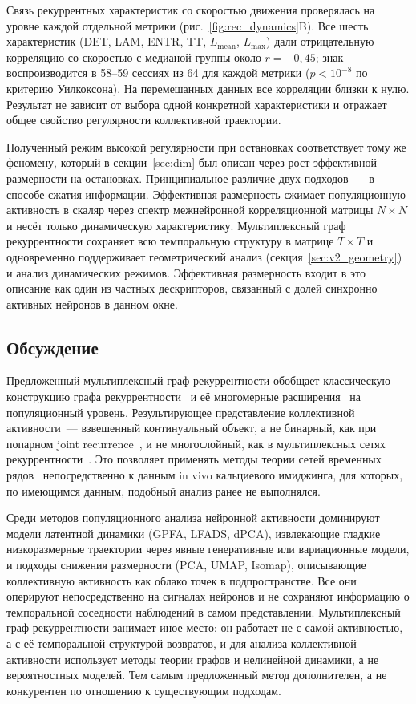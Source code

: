Связь рекуррентных характеристик со скоростью движения проверялась на уровне каждой отдельной метрики (рис.~\ref{fig:rec_dynamics}B). Все шесть характеристик (DET, LAM, ENTR, TT, $L_{\text{mean}}$, $L_{\text{max}}$) дали отрицательную корреляцию со скоростью с медианой группы около $r = -0{,}45$; знак воспроизводится в 58--59 сессиях из 64 для каждой метрики ($p < 10^{-8}$ по критерию Уилкоксона). На перемешанных данных все корреляции близки к нулю. Результат не зависит от выбора одной конкретной характеристики и отражает общее свойство регулярности коллективной траектории.

Полученный режим высокой регулярности при остановках соответствует тому же феномену, который в секции~\ref{sec:dim} был описан через рост эффективной размерности на остановках. Принципиальное различие двух подходов~--- в способе сжатия информации. Эффективная размерность сжимает популяционную активность в скаляр через спектр межнейронной корреляционной матрицы $N \times N$ и несёт только динамическую характеристику. Мультиплексный граф рекуррентности сохраняет всю темпоральную структуру в матрице $T \times T$ и одновременно поддерживает геометрический анализ (секция~\ref{sec:v2_geometry}) и анализ динамических режимов. Эффективная размерность входит в это описание как один из частных дескрипторов, связанный с долей синхронно активных нейронов в данном окне.


\subsection{Обсуждение}\label{sec:v2_discussion}

Предложенный мультиплексный граф рекуррентности обобщает классическую конструкцию графа рекуррентности~\cite{Eckmann1987, Marwan2007} и её многомерные расширения~\cite{Romano2004, Eroglu2018} на популяционный уровень. Результирующее представление коллективной активности~--- взвешенный континуальный объект, а не бинарный, как при попарном joint recurrence~\cite{Romano2004}, и не многослойный, как в мультиплексных сетях рекуррентности~\cite{Eroglu2018}. Это позволяет применять методы теории сетей временных рядов~\cite{Varley2022} непосредственно к данным in vivo кальциевого имиджинга, для которых, по имеющимся данным, подобный анализ ранее не выполнялся.

Среди методов популяционного анализа нейронной активности доминируют модели латентной динамики (GPFA, LFADS, dPCA), извлекающие гладкие низкоразмерные траектории через явные генеративные или вариационные модели, и подходы снижения размерности (PCA, UMAP, Isomap), описывающие коллективную активность как облако точек в подпространстве. Все они оперируют непосредственно на сигналах нейронов и не сохраняют информацию о темпоральной соседности наблюдений в самом представлении. Мультиплексный граф рекуррентности занимает иное место: он работает не с самой активностью, а с её темпоральной структурой возвратов, и для анализа коллективной активности использует методы теории графов и нелинейной динамики, а не вероятностных моделей. Тем самым предложенный метод дополнителен, а не конкурентен по отношению к существующим подходам.

